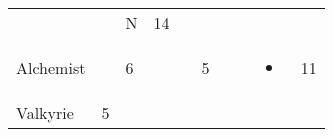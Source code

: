 \documentclass[12pt]{article}
\begin{document}
\begin{longtable}[]{@{}llllllllll@{}}
\begin{minipage}[t]{0.06\columnwidth}
\strut\end{minipage} &
\begin{minipage}[t]{0.06\columnwidth}\raggedright\strut
\strut\end{minipage} &
\begin{minipage}[t]{0.07\columnwidth}\raggedright\strut
N
\strut\end{minipage} &
\begin{minipage}[t]{0.08\columnwidth}\raggedright\strut
14
\strut\end{minipage}\tabularnewline
\begin{minipage}[t]{0.13\columnwidth}\raggedright\strut
Alchemist
\strut\end{minipage} &
\begin{minipage}[t]{0.06\columnwidth}\raggedright\strut
\strut\end{minipage} &
\begin{minipage}[t]{0.06\columnwidth}\raggedright\strut
6
\strut\end{minipage} &
\begin{minipage}[t]{0.06\columnwidth}\raggedright\strut
\strut\end{minipage} &
\begin{minipage}[t]{0.06\columnwidth}\raggedright\strut
\strut\end{minipage} &
\begin{minipage}[t]{0.06\columnwidth}\raggedright\strut
5
\strut\end{minipage} &
\begin{minipage}[t]{0.06\columnwidth}\raggedright\strut
\strut\end{minipage} &
\begin{minipage}[t]{0.06\columnwidth}\raggedright\strut
\strut\end{minipage} &
\begin{minipage}[t]{0.07\columnwidth}\raggedright\strut
\begin{itemize}
\item
\end{itemize}
\strut\end{minipage} &
\begin{minipage}[t]{0.08\columnwidth}\raggedright\strut
11
\strut\end{minipage}\tabularnewline
\begin{minipage}[t]{0.13\columnwidth}\raggedright\strut
Valkyrie
\strut\end{minipage} &
\begin{minipage}[t]{0.06\columnwidth}\raggedright\strut
5

\end{minipage}
\end{longtable}
\end{document}
